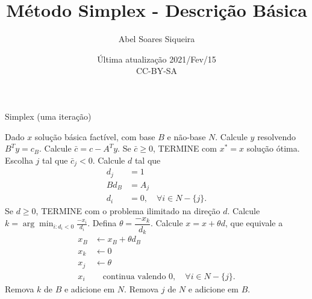 \documentclass{article}
\author{Abel Soares Siqueira}
\title{Método Simplex - Descrição Básica}
\date{Última atualização 2021/Fev/15 \\ CC-BY-SA}
\begin{document}
  \maketitle

  \begin{algorithm}
    \caption{Simplex (uma iteração)}
    \begin{algorithmic}[1]
      \State Dado $x$ solução básica factível, com base $B$ e não-base $N$.
      \State Calcule $y$ resolvendo $B^T y = c_B$.
      \State Calcule $\bar{c} = c - A^T y$.
      \State Se $\bar{c} \geq 0$, TERMINE com $x^* = x$ solução ótima.
      \State Escolha $j$ tal que $\bar{c}_j < 0$.
      \State Calcule $d$ tal que
        \begin{align*}
          d_j & = 1 \\
          B d_B & = A_j \\
          d_i & = 0, \quad \forall i \in N-\{j\}.
        \end{align*}
      \State Se $d \geq 0$, TERMINE com o problema ilimitado na direção $d$.
      \State Calcule $\displaystyle k = \arg\min_{i: d_i < 0} \frac{-x_i}{d_i}$.
      \State Defina $\theta = \dfrac{-x_k}{d_k}$.
      \State Calcule $x = x + \theta d$, que equivale a
      \begin{align*}
        x_B & \leftarrow x_B + \theta d_B \\
        x_k & \leftarrow 0 \\
        x_j & \leftarrow \theta \\
        x_i & \quad \text{continua valendo } 0, \quad \forall i \in N-\{j\}.
      \end{align*}
      \State Remova $k$ de $B$ e adicione em $N$.
      \State Remova $j$ de $N$ e adicione em $B$.
    \end{algorithmic}
  \end{algorithm}
\end{document}
